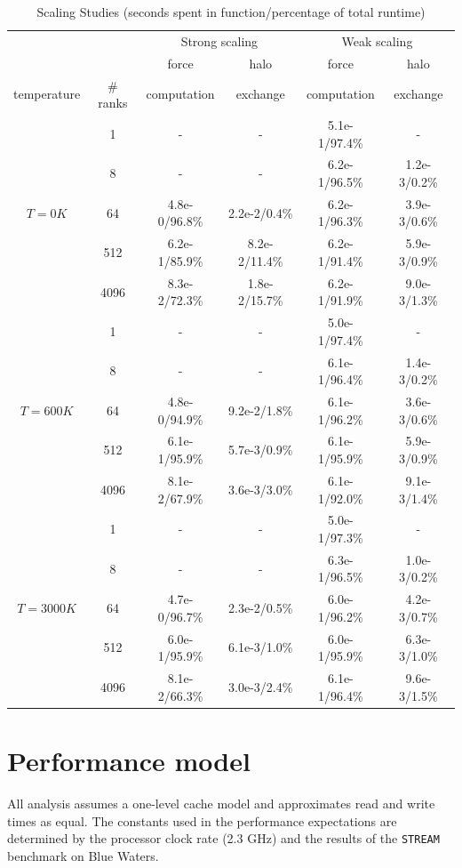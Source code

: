 \documentclass[12pt]{article}
\begin{document}
\begin{table}[h!]
\centering
\begin{tabular}{c c | c c | c c}
\toprule
& \multicolumn{1}{c}{} & \multicolumn{2}{c}{Strong scaling} & \multicolumn{2}{c}{Weak scaling} \\
\cmidrule(r){3-4} \cmidrule(r){5-6}
\multicolumn{1}{c}{} & \multicolumn{1}{c}{}  & \multicolumn{1}{c}{force} & \multicolumn{1}{c}{halo} & \multicolumn{1}{c}{force} & \multicolumn{1}{c}{halo} \\
\multicolumn{1}{c}{temperature} & \multicolumn{1}{c}{\# ranks} & \multicolumn{1}{c}{computation} & \multicolumn{1}{c}{exchange} & \multicolumn{1}{c}{computation} & \multicolumn{1}{c}{exchange} \\
\midrule
 & 1 & - & - & 5.1e-1/97.4\% & - \\ 
& 8 & - & - & 6.2e-1/96.5\% & 1.2e-3/0.2\% \\ 
$T = 0 K$ & 64 & 4.8e-0/96.8\% & 2.2e-2/0.4\% & 6.2e-1/96.3\% & 3.9e-3/0.6\% \\ 
& 512 & 6.2e-1/85.9\% & 8.2e-2/11.4\% & 6.2e-1/91.4\% & 5.9e-3/0.9\% \\ 
& 4096 & 8.3e-2/72.3\% & 1.8e-2/15.7\% & 6.2e-1/91.9\% & 9.0e-3/1.3\% \\ 
\midrule
 & 1 & - & - & 5.0e-1/97.4\% & - \\ 
& 8 & - & - & 6.1e-1/96.4\% & 1.4e-3/0.2\% \\ 
$T = 600 K$ & 64 & 4.8e-0/94.9\% & 9.2e-2/1.8\% & 6.1e-1/96.2\% & 3.6e-3/0.6\% \\ 
& 512 & 6.1e-1/95.9\% & 5.7e-3/0.9\% & 6.1e-1/95.9\% & 5.9e-3/0.9\% \\ 
& 4096 & 8.1e-2/67.9\% & 3.6e-3/3.0\% & 6.1e-1/92.0\% & 9.1e-3/1.4\% \\ 
\midrule
 & 1 & - & - & 5.0e-1/97.3\% & - \\ 
& 8 & - & - & 6.3e-1/96.5\% & 1.0e-3/0.2\% \\ 
$T = 3000 K$ & 64 & 4.7e-0/96.7\% & 2.3e-2/0.5\% & 6.0e-1/96.2\% & 4.2e-3/0.7\% \\ 
& 512 & 6.0e-1/95.9\% & 6.1e-3/1.0\% & 6.0e-1/95.9\% & 6.3e-3/1.0\% \\ 
& 4096 & 8.1e-2/66.3\% & 3.0e-3/2.4\% & 6.1e-1/96.4\% & 9.6e-3/1.5\% \\ 
\bottomrule
\end{tabular}
\caption{Scaling Studies (seconds spent in function/percentage of total runtime)}
\label{tbl:times}
\end{table}

\section{Performance model}
All analysis assumes a one-level cache model and approximates read and write 
times as equal.  The constants used in the performance expectations are determined 
by the processor clock rate (2.3 GHz) and the results of the \texttt{STREAM} benchmark 
on Blue Waters. \\
\end{document}
